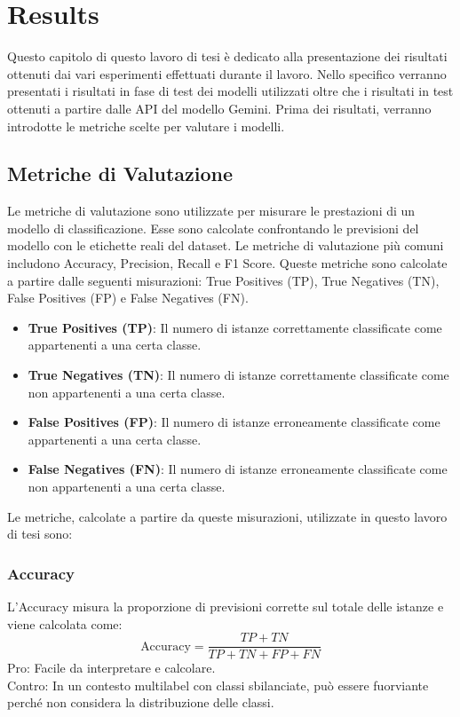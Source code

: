 \documentclass[../../Thesis.tex]{subfiles}
\begin{document}
\chapter{Results}
\label{chap:results}
Questo capitolo di questo lavoro di tesi è dedicato alla presentazione dei risultati ottenuti dai vari esperimenti effettuati durante il lavoro. Nello specifico verranno presentati i risultati in fase di test dei modelli utilizzati oltre che i risultati in test ottenuti a partire dalle API del modello Gemini. Prima dei risultati, verranno introdotte le metriche scelte per valutare i modelli.
\section{Metriche di Valutazione}
Le metriche di valutazione sono utilizzate per misurare le prestazioni di un modello di classificazione. Esse sono calcolate confrontando le previsioni del modello con le etichette reali del dataset. Le metriche di valutazione più comuni includono Accuracy, Precision, Recall e F1 Score. Queste metriche sono calcolate a partire dalle seguenti misurazioni: True Positives (TP), True Negatives (TN), False Positives (FP) e False Negatives (FN).\\
\begin{itemize}
    \item \textbf{True Positives (TP)}: Il numero di istanze correttamente classificate come appartenenti a una certa classe.
    \item \textbf{True Negatives (TN)}: Il numero di istanze correttamente classificate come non appartenenti a una certa classe.
    \item \textbf{False Positives (FP)}: Il numero di istanze erroneamente classificate come appartenenti a una certa classe.
    \item \textbf{False Negatives (FN)}: Il numero di istanze erroneamente classificate come non appartenenti a una certa classe.
\end{itemize}

Le metriche, calcolate a partire da queste misurazioni, utilizzate in questo lavoro di tesi sono:

\subsection*{Accuracy}
L'Accuracy misura la proporzione di previsioni corrette sul totale delle istanze e viene calcolata come:
$$ \text{Accuracy} = \frac{TP + TN}{TP + TN + FP + FN} $$
Pro: Facile da interpretare e calcolare.\\
Contro: In un contesto multilabel con classi sbilanciate, può essere fuorviante perché non considera la distribuzione delle classi.
\end{document}
